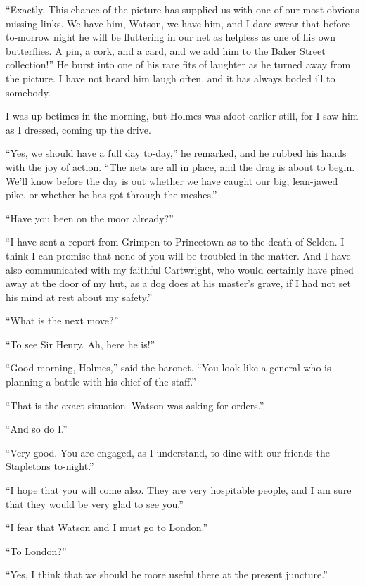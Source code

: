 \documentclass[paper=5.5in:8.5in,BCOR=7mm,twoside,DIV=calc,12pt,usegeometry,openany,chapterprefix,endperiod]{scrbook} %
\begin{document}
\enquote{Exactly. This chance of the picture has supplied us with one of our most obvious missing links. We have him, Watson, we have him, and I dare swear that before to-morrow night he will be fluttering in our net as helpless as one of his own butterflies. A pin, a cork, and a card, and we add him to the Baker Street collection!} He burst into one of his rare fits of laughter as he turned away from the picture. I have not heard him laugh often, and it has always boded ill to somebody.

I was up betimes in the morning, but Holmes was afoot earlier still, for I saw him as I dressed, coming up the drive.

\enquote{Yes, we should have a full day to-day,} he remarked, and he rubbed his hands with the joy of action. \enquote{The nets are all in place, and the drag is about to begin. We'll know before the day is out whether we have caught our big, lean-jawed pike, or whether he has got through the meshes.}

\enquote{Have you been on the moor already?}

\enquote{I have sent a report from Grimpen to Princetown as to the death of Selden. I think I can promise that none of you will be troubled in the matter. And I have also communicated with my faithful Cartwright, who would certainly have pined away at the door of my hut, as a dog does at his master's grave, if I had not set his mind at rest about my safety.}

\enquote{What is the next move?}

\enquote{To see Sir Henry. Ah, here he is!}

\enquote{Good morning, Holmes,} said the baronet. \enquote{You look like a general who is planning a battle with his chief of the staff.}

\enquote{That is the exact situation. Watson was asking for orders.}

\enquote{And so do I.}

\enquote{Very good. You are engaged, as I understand, to dine with our friends the Stapletons to-night.}

\enquote{I hope that you will come also. They are very hospitable people, and I am sure that they would be very glad to see you.}

\enquote{I fear that Watson and I must go to London.}

\enquote{To London?}

\enquote{Yes, I think that we should be more useful there at the present juncture.}
\end{document}
